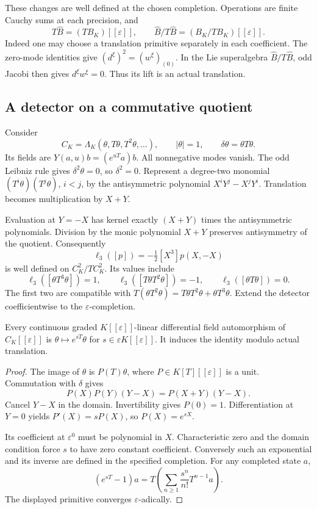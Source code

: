 These changes are well defined at the
chosen completion. Operations are finite
Cauchy sums at each precision, and
\[
 T\widehat B=(TB_K)[[\varepsilon]],\qquad
 \widehat B/T\widehat B
       =(B_K/TB_K)[[\varepsilon]].
\]
Indeed one may choose a translation
primitive separately in each coefficient.
The zero-mode identities give
$(d^\xi)^2=(w^\xi)_{(0)}$.
In the Lie superalgebra
$\widehat B/T\widehat B$, odd Jacobi
then gives $d^\xi w^\xi=0$.
Thus its lift is an actual translation.

\subsection{A detector on a commutative quotient}

Consider
\[
 C_K=\Lambda_K(\theta,T\theta,T^2\theta,\ldots),
 \qquad |\theta|=1,\qquad
 \delta\theta=\theta T\theta.
\]
Its fields are $Y(a,u)b=(e^{uT}a)b$.
All nonnegative modes vanish.
The odd Leibniz rule gives
$\delta^2\theta=0$, so $\delta^2=0$.
Represent a degree-two monomial
$(T^i\theta)(T^j\theta)$, $i<j$, by
the antisymmetric polynomial
$X^iY^j-X^jY^i$.
Translation becomes multiplication by
$X+Y$.

Evaluation at $Y=-X$ has kernel exactly
$(X+Y)$ times the antisymmetric
polynomials. Division by the monic
polynomial $X+Y$ preserves antisymmetry
of the quotient.
Consequently
\begin{equation}\label{v4-arith:md:eq:curvature-detector}
 \ell_3([p])=-\tfrac12[X^3]p(X,-X)
\end{equation}
is well defined on $C_K^2/TC_K^2$.
Its values include
\[
 \ell_3([\theta T^3\theta])=1,\qquad
 \ell_3([T\theta T^2\theta])=-1,\qquad
 \ell_3([\theta T\theta])=0.
\]
The first two are compatible with
$T(\theta T^2\theta)
=T\theta T^2\theta+\theta T^3\theta$.
Extend the detector coefficientwise
to the $\varepsilon$-completion.

\begin{lemma}
\label{v4-arith:md:lem:quotient-automorphisms}
Every continuous graded
$K[[\varepsilon]]$-linear differential
field automorphism of
$C_K[[\varepsilon]]$ is
$\theta\mapsto e^{sT}\theta$ for
$s\in\varepsilon K[[\varepsilon]]$.
It induces the identity modulo
actual translation.
\end{lemma}

\begin{proof}
The image of $\theta$ is
$P(T)\theta$, where
$P\in K[T][[\varepsilon]]$ is a unit.
Commutation with $\delta$ gives
\[
 P(X)P(Y)(Y-X)=P(X+Y)(Y-X).
\]
Cancel $Y-X$ in the domain.
Invertibility gives $P(0)=1$.
Differentiation at $Y=0$ yields
$P'(X)=sP(X)$, so $P(X)=e^{sX}$.

Its coefficient at $\varepsilon^0$
must be polynomial in $X$.
Characteristic zero and the domain
condition force $s$ to have zero
constant coefficient.
Conversely such an exponential and
its inverse are defined in the
specified completion.
For any completed state $a$,
\[
 (e^{sT}-1)a
   =T\left(\sum_{n\geq1}
           \frac{s^n}{n!}T^{n-1}a\right).
\]
The displayed primitive converges
$\varepsilon$-adically.
\end{proof}

